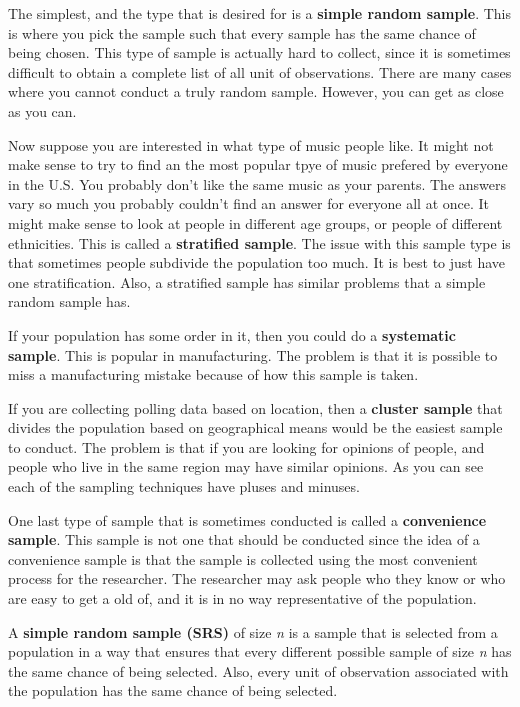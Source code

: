 \documentclass[
]{book}
\begin{document}
The simplest, and the type that is desired for is a \textbf{simple random sample}. This is where you pick the sample such that every sample has the same chance of being chosen. This type of sample is actually hard to collect, since it is sometimes difficult to obtain a complete list of all unit of observations. There are many cases where you cannot conduct a truly random sample. However, you can get as close as you can.

Now suppose you are interested in what type of music people like. It might not make sense to try to find an the most popular tpye of music prefered by everyone in the U.S. You probably don't like the same music as your parents. The answers vary so much you probably couldn't find an answer for everyone all at once. It might make sense to look at people in different age groups, or people of different ethnicities. This is called a \textbf{stratified sample}. The issue with this sample type is that sometimes people subdivide the population too much. It is best to just have one stratification. Also, a stratified sample has similar problems that a simple random sample has.

If your population has some order in it, then you could do a \textbf{systematic sample}. This is popular in manufacturing. The problem is that it is possible to miss a manufacturing mistake because of how this sample is taken.

If you are collecting polling data based on location, then a \textbf{cluster sample} that divides the population based on geographical means would be the easiest sample to conduct. The problem is that if you are looking for opinions of people, and people who live in the same region may have similar opinions. As you can see each of the sampling techniques have pluses and minuses.

One last type of sample that is sometimes conducted is called a \textbf{convenience sample}. This sample is not one that should be conducted since the idea of a convenience sample is that the sample is collected using the most convenient process for the researcher. The researcher may ask people who they know or who are easy to get a old of, and it is in no way representative of the population.

A \textbf{simple random sample (SRS)} of size \emph{n} is a sample that is selected from a population in a way that ensures that every different possible sample of size \emph{n} has the same chance of being selected. Also, every unit of observation associated with the population has the same chance of being selected.
\end{document}
